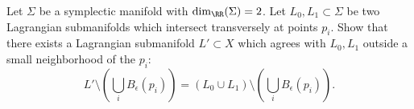 

	Let $\Sigma$ be a symplectic manifold with $\dim_\RR(\Sigma)=2$. Let $L_0, L_1\subset \Sigma$ be two Lagrangian submanifolds which intersect transversely at points $p_i$.  
	Show that there exists a Lagrangian submanifold $L'\subset X$ which agrees with $L_0, L_1$ outside a small neighborhood of the $p_i$: 
	\[L'\setminus \left(\bigcup_{i} B_\epsilon(p_i)\right)=(L_0\cup L_1) \setminus \left(\bigcup_{i} B_\epsilon(p_i)\right).\]

